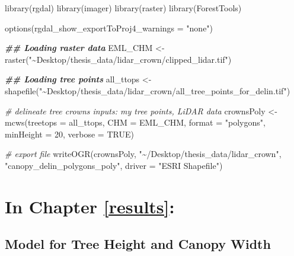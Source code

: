 \documentclass[12pt,twoside]{reedthesis}
\newenvironment{Shaded}{\begin{snugshade}}{\end{snugshade}}
\newcommand{\AttributeTok}[1]{\textcolor[rgb]{0.77,0.63,0.00}{#1}}
\newcommand{\CommentTok}[1]{\textcolor[rgb]{0.56,0.35,0.01}{\textit{#1}}}
\newcommand{\ConstantTok}[1]{\textcolor[rgb]{0.00,0.00,0.00}{#1}}
\newcommand{\DecValTok}[1]{\textcolor[rgb]{0.00,0.00,0.81}{#1}}
\newcommand{\DocumentationTok}[1]{\textcolor[rgb]{0.56,0.35,0.01}{\textbf{\textit{#1}}}}
\newcommand{\FunctionTok}[1]{\textcolor[rgb]{0.00,0.00,0.00}{#1}}
\newcommand{\NormalTok}[1]{#1}
\newcommand{\OtherTok}[1]{\textcolor[rgb]{0.56,0.35,0.01}{#1}}
\newcommand{\StringTok}[1]{\textcolor[rgb]{0.31,0.60,0.02}{#1}}
\begin{document}
\footnotesize
\begin{Shaded}
\begin{Highlighting}[]
\FunctionTok{library}\NormalTok{(rgdal)}
\FunctionTok{library}\NormalTok{(imager)}
\FunctionTok{library}\NormalTok{(raster)}
\FunctionTok{library}\NormalTok{(ForestTools)}

\FunctionTok{options}\NormalTok{(}\AttributeTok{rgdal\_show\_exportToProj4\_warnings =} \StringTok{"none"}\NormalTok{)}

\DocumentationTok{\#\# Loading raster data}
\NormalTok{EML\_CHM }\OtherTok{\textless{}{-}} \FunctionTok{raster}\NormalTok{(}\StringTok{"\textasciitilde{}Desktop/thesis\_data/lidar\_crown/clipped\_lidar.tif"}\NormalTok{)}

\DocumentationTok{\#\# Loading tree points}
\NormalTok{all\_ttops }\OtherTok{\textless{}{-}} \FunctionTok{shapefile}\NormalTok{(}\StringTok{"\textasciitilde{}Desktop/thesis\_data/lidar\_crown/all\_tree\_points\_for\_delin.tif"}\NormalTok{)}

\CommentTok{\# delineate tree crowns inputs: my tree points, LiDAR data}
\NormalTok{crownsPoly }\OtherTok{\textless{}{-}} \FunctionTok{mcws}\NormalTok{(}\AttributeTok{treetops =}\NormalTok{ all\_ttops, }\AttributeTok{CHM =}\NormalTok{ EML\_CHM, }\AttributeTok{format =} \StringTok{"polygons"}\NormalTok{,}
    \AttributeTok{minHeight =} \DecValTok{20}\NormalTok{, }\AttributeTok{verbose =} \ConstantTok{TRUE}\NormalTok{)}

\CommentTok{\# export file}
\FunctionTok{writeOGR}\NormalTok{(crownsPoly, }\StringTok{"\textasciitilde{}/Desktop/thesis\_data/lidar\_crown"}\NormalTok{, }\StringTok{"canopy\_delin\_polygons\_poly"}\NormalTok{,}
    \AttributeTok{driver =} \StringTok{"ESRI Shapefile"}\NormalTok{)}
\end{Highlighting}
\end{Shaded}
\hypertarget{in-chapter-refresults}{%
\section*{\texorpdfstring{\textbf{In Chapter} \ref{results}\textbf{:}}{In Chapter \ref{results}:}}\label{in-chapter-refresults}}

\hypertarget{model-for-tree-height-and-canopy-width}{%
\subsection*{Model for Tree Height and Canopy Width}\label{model-for-tree-height-and-canopy-width}}
\end{document}
